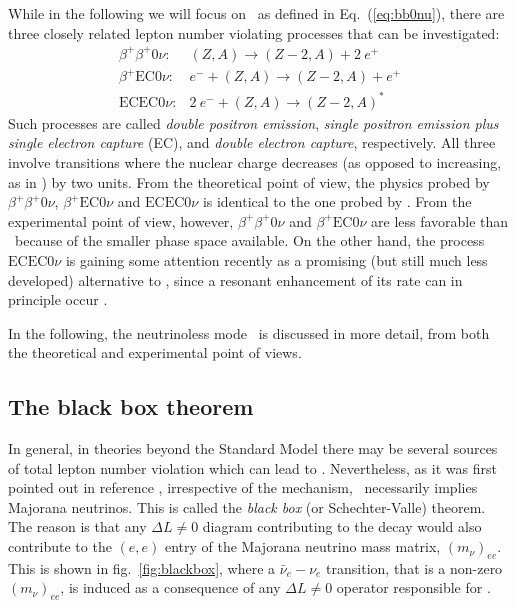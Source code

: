 While in the following we will focus on \bbonu\ as defined in Eq.~(\ref{eq:bb0nu}), there are three closely related lepton number violating processes that can be investigated:
%
\begin{eqnarray}
\beta^+\beta^+0\nu: & (Z,A) \to (Z-2,A) + 2\ e^+  \label{eq:b+b+}\\
\beta^+\text{EC}0\nu: & e^- + (Z,A) \to (Z-2,A) + e^+ \label{eq:b+EC}\\
\text{ECEC}0\nu: & 2\ e^- + (Z,A) \to (Z-2,A)^\ast \label{eq:ECEC}
\end{eqnarray}
%
Such processes are called \emph{double positron emission}, \emph{single positron emission plus single electron capture} (EC), and \emph{double electron capture}, respectively. All three involve transitions where the nuclear charge decreases (as opposed to increasing, as in \bbonu) by two units. From the theoretical point of view, the physics probed by $\beta^+\beta^+0\nu$, $\beta^+\text{EC}0\nu$ and $\text{ECEC}0\nu$ is identical to the one probed by \bbonu. From the experimental point of view, however, $\beta^+\beta^+0\nu$ and $\beta^+\text{EC}0\nu$ are less favorable than \bbonu\ because of the smaller phase space available. On the other hand, the process $\text{ECEC}0\nu$ is gaining some attention recently as a promising (but still much less developed) alternative to \bbonu, since a resonant enhancement of its rate can in principle occur \cite{Eliseev:2011zza}.

In the following, the neutrinoless mode \bbonu\ is discussed in more detail, from both the theoretical and experimental point of views.

\subsection{The black box theorem } \label{subsec:bb0nu_blackbox}
In general, in theories beyond the Standard Model there may be several sources of total lepton number violation which can lead to \bbonu. Nevertheless, as it was first pointed out in reference \cite{Schechter:1981bd}, irrespective of the mechanism, \bbonu\ necessarily implies Majorana neutrinos. This is called the \emph{black box} (or Schechter-Valle) theorem. The reason is that any $\Delta L\neq 0$ diagram contributing to the decay would also contribute to the $(e,e)$ entry of the Majorana neutrino mass matrix, $(m_{\nu})_{ee}$. This is shown in fig.~\ref{fig:blackbox}, where a $\bar{\nu}_e-\nu_e$ transition, that is a non-zero $(m_{\nu})_{ee}$, is induced as a consequence of any $\Delta L\neq 0$ operator responsible for \bbonu.

